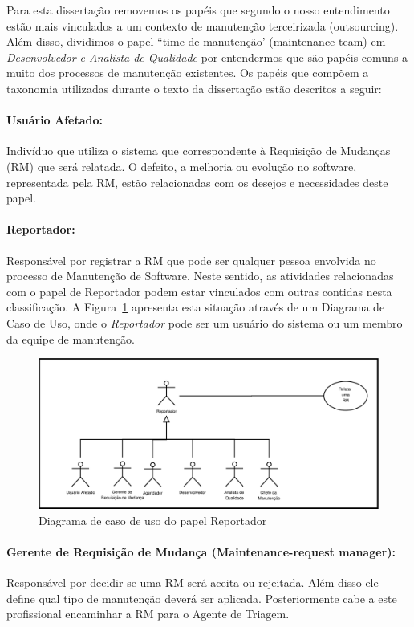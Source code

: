 Para esta dissertação removemos os papéis que segundo o nosso entendimento estão
mais vinculados a um contexto de manutenção terceirizada (outsourcing).  Além
disso, dividimos o papel ``time de manutenção' (maintenance team) em
\textit{Desenvolvedor e Analista de Qualidade} por entendermos que são papéis
comuns a muito dos processos de manutenção existentes. Os papéis que compõem a
taxonomia utilizadas durante o texto da dissertação estão descritos a seguir:

\paragraph{Usuário Afetado:}
Indivíduo que utiliza o sistema que correspondente à Requisição de Mudanças (RM)
que será relatada. O defeito, a melhoria ou evolução no software, representada
pela RM, estão relacionadas com os desejos e necessidades deste papel.

\paragraph{Reportador:}
Responsável por registrar a RM que pode ser qualquer pessoa envolvida no
processo de Manutenção de Software. Neste sentido, as atividades relacionadas
com o papel de Reportador podem estar vinculados com outras contidas nesta
classificação. A Figura~\ref{fig:diagrama-caso-uso-reportador} apresenta esta
situação através de um Diagrama de Caso de Uso, onde o \textit{Reportador} pode
ser um usuário do sistema ou um membro da equipe de manutenção.

\begin{figure}[htpb]
	\centering
	\includegraphics[width=0.8\linewidth]{./chapter-manutencao-software-visao-geral/img/diagrama-caso-uso-reportador.pdf}
	\caption{Diagrama de caso de uso do papel Reportador}
\label{fig:diagrama-caso-uso-reportador}
\end{figure}

\paragraph{Gerente de Requisição de Mudança (Maintenance-request manager):}
Res\-pon\-sá\-vel por decidir se uma RM será aceita ou rejeitada. Além disso ele
define qual tipo de manutenção deverá ser aplicada. Posteriormente cabe a este
profissional encaminhar a RM para o Agente de Triagem.

